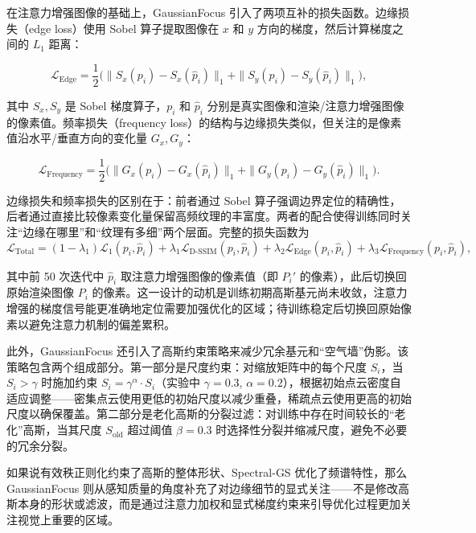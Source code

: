 在注意力增强图像的基础上，GaussianFocus 引入了两项互补的损失函数。边缘损失（edge loss）使用 Sobel 算子提取图像在 $x$ 和 $y$ 方向的梯度，然后计算梯度之间的 $L_1$ 距离：

\begin{equation}
\mathcal{L}_{\mathrm{Edge}} = \frac{1}{2}\bigl(\|S_x(p_i) - S_x(\hat{p}_i)\|_1 + \|S_y(p_i) - S_y(\hat{p}_i)\|_1\bigr),
\label{eq:02_gf_edge}
\end{equation}

其中 $S_x, S_y$ 是 Sobel 梯度算子，$p_i$ 和 $\hat{p}_i$ 分别是真实图像和渲染/注意力增强图像的像素值。频率损失（frequency loss）的结构与边缘损失类似，但关注的是像素值沿水平/垂直方向的变化量 $G_x, G_y$：

\begin{equation}
\mathcal{L}_{\mathrm{Frequency}} = \frac{1}{2}\bigl(\|G_x(p_i) - G_x(\hat{p}_i)\|_1 + \|G_y(p_i) - G_y(\hat{p}_i)\|_1\bigr).
\label{eq:02_gf_freq}
\end{equation}

边缘损失和频率损失的区别在于：前者通过 Sobel 算子强调边界定位的精确性，后者通过直接比较像素变化量保留高频纹理的丰富度。两者的配合使得训练同时关注``边缘在哪里''和``纹理有多细''两个层面。完整的损失函数为
\begin{equation}
\mathcal{L}_{\mathrm{Total}} = (1-\lambda_1)\mathcal{L}_1(p_i, \hat{p}_i) + \lambda_1\mathcal{L}_{\mathrm{D\text{-}SSIM}}(p_i, \hat{p}_i) + \lambda_2\mathcal{L}_{\mathrm{Edge}}(p_i, \hat{p}_i) + \lambda_3\mathcal{L}_{\mathrm{Frequency}}(p_i, \hat{p}_i),
\label{eq:02_gf_total}
\end{equation}

其中前 50 次迭代中 $\hat{p}_i$ 取注意力增强图像的像素值（即 $P_i'$ 的像素），此后切换回原始渲染图像 $P_i$ 的像素。这一设计的动机是训练初期高斯基元尚未收敛，注意力增强的梯度信号能更准确地定位需要加强优化的区域；待训练稳定后切换回原始像素以避免注意力机制的偏差累积。

此外，GaussianFocus 还引入了高斯约束策略来减少冗余基元和``空气墙''伪影。该策略包含两个组成部分。第一部分是尺度约束：对缩放矩阵中的每个尺度 $S_i$，当 $S_i > \gamma$ 时施加约束 $S_i = \gamma^{\alpha} \cdot S_i$（实验中 $\gamma = 0.3$, $\alpha = 0.2$），根据初始点云密度自适应调整——密集点云使用更低的初始尺度以减少重叠，稀疏点云使用更高的初始尺度以确保覆盖。第二部分是老化高斯的分裂过滤：对训练中存在时间较长的``老化''高斯，当其尺度 $S_{\mathrm{old}}$ 超过阈值 $\beta = 0.3$ 时选择性分裂并缩减尺度，避免不必要的冗余分裂。

如果说有效秩正则化约束了高斯的整体形状、Spectral-GS 优化了频谱特性，那么 GaussianFocus 则从感知质量的角度补充了对边缘细节的显式关注——不是修改高斯本身的形状或滤波，而是通过注意力加权和显式梯度约束来引导优化过程更加关注视觉上重要的区域。

